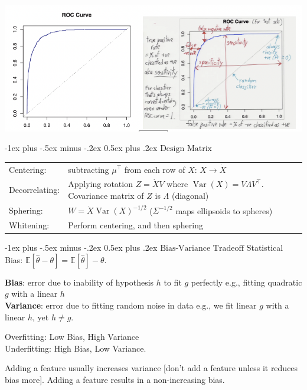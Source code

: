 \documentclass[10pt,landscape]{article}
\makeatletter
\DeclareMathOperator*{\Var}{Var}
\def\E{\mathbb{E}}
\renewcommand{\section}{\@startsection{section}{1}{0mm}%
                                {-1ex plus -.5ex minus -.2ex}%
                                {0.5ex plus .2ex}%
                                {\normalfont\large\bfseries}}
\makeatother
\begin{document}
\begin{multicols}{3}
\includegraphics[width=\linewidth]{ROC.png}

\section{$\boxed{\text{Design Matrix}}$}
\begin{tabular}{@{}p{\the\MyLen}%
                @{}p{\linewidth-\the\MyLen}@{}}
Centering:         &  subtracting $\mu^\top$ from each row of $X$: $X \xrightarrow{}\dot X$\\
Decorrelating: & Applying rotation $Z = \dot X V$ where $\Var(X) = V \Lambda V^\top$. Covariance matrix of $Z$ is $\Lambda$ (diagonal)\\
Sphering: & $W = \dot X \Var(X)^{-1/2}$ ($\Sigma^{-1/2}$ maps ellipsoids to spheres)\\
Whitening: & Perform centering, and then sphering \\
\end{tabular}

\section{$\boxed{\text{Bias-Variance Tradeoff}}$}
Statistical Bias: $\E[\hat\theta-\theta]=\E[\hat\theta]-\theta$.

\textbf{Bias}: error due to inability of hypothesis $h$ to fit $g$ perfectly e.g., fitting quadratic $g$ with a linear $h$\\
\textbf{Variance}: error due to fitting random noise in data
e.g., we fit linear $g$ with a linear $h$, yet $h \neq g$.

Overfitting: Low Bias, High Variance \\
Underfitting: High Bias, Low Variance.

Adding a feature usually increases variance [don’t add a feature unless it reduces bias more]. Adding a feature results in a non-increasing bias. 


\end{multicols}
\end{document}
